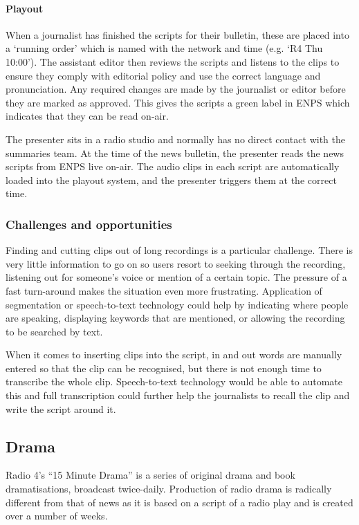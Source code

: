 \paragraph{Playout}
When a journalist has finished the scripts for their bulletin, these are placed into a `running order' which is named
with the network and time (e.g. `R4 Thu 10:00'). The assistant editor then reviews the scripts and listens to the clips
to ensure they comply with editorial policy and use the correct language and pronunciation.  Any required changes are
made by the journalist or editor before they are marked as approved. This gives the scripts a green label in ENPS which
indicates that they can be read on-air.

The presenter sits in a radio studio and normally has no direct contact with the summaries team. At the time of the
news bulletin, the presenter reads the news scripts from ENPS live on-air. The audio clips in each script are
automatically loaded into the playout system, and the presenter triggers them at the correct time.

\subsubsection{Challenges and opportunities}
Finding and cutting clips out of long recordings is a particular challenge.  There is very little information to go on
so users resort to seeking through the recording, listening out for someone's voice or mention of a certain topic.  The
pressure of a fast turn-around makes the situation even more frustrating.  Application of segmentation or
speech-to-text technology could help by indicating where people are speaking, displaying keywords that are mentioned,
or allowing the recording to be searched by text.

When it comes to inserting clips into the script, in and out words are manually entered so that the clip can be
recognised, but there is not enough time to transcribe the whole clip. Speech-to-text technology would be able to
automate this and full transcription could further help the journalists to recall the clip and write the script around
it.

\subsection{Drama}\label{sec:drama}
Radio 4's ``15 Minute Drama'' is a series of original drama and book dramatisations, broadcast twice-daily. Production
of radio drama is radically different from that of news as it is based on a script of a radio play and is created over
a number of weeks.

